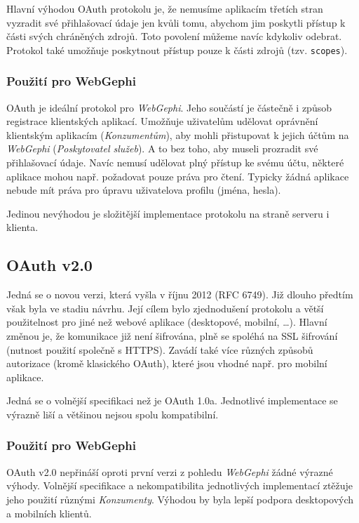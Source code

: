 \documentclass[thesis=M,czech]{FITthesis}[2014/05/6]
\begin{document}
Hlavní výhodou OAuth protokolu je, že nemusíme aplikacím třetích stran vyzradit své přihlašovací údaje jen kvůli tomu, abychom jim poskytli přístup k části svých chráněných zdrojů. Toto povolení můžeme navíc
kdykoliv odebrat. Protokol také umožňuje poskytnout přístup pouze k části zdrojů (tzv. \texttt{scopes}).

\subsubsection{Použití pro WebGephi}
OAuth je ideální protokol pro \textit{WebGephi}. Jeho součástí je částečně i způsob registrace klientských aplikací. Umožňuje uživatelům udělovat oprávnění klientským aplikacím (\textit{Konzumentům}), aby mohli 
přistupovat k jejich účtům na \textit{WebGephi} (\textit{Poskytovatel služeb}). A to bez toho, aby museli prozradit své přihlašovací údaje. Navíc nemusí udělovat plný přístup
ke svému účtu, některé aplikace mohou např. požadovat pouze práva pro čtení. Typicky žádná aplikace nebude mít práva pro úpravu uživatelova profilu (jména, hesla).

Jedinou nevýhodou je složitější implementace protokolu na straně serveru i klienta.

\subsection{OAuth v2.0\cite{oauth:v2}}
Jedná se o novou verzi, která vyšla v říjnu 2012 (RFC 6749). Již dlouho předtím však byla ve stadiu návrhu. Její cílem bylo zjednodušení protokolu
a větší použitelnost pro jiné než webové aplikace (desktopové, mobilní, \ldots). Hlavní změnou je, že komunikace již není šifrována, plně se spoléhá na SSL šifrování
(nutnost použití společně s HTTPS). Zavádí také více různých způsobů autorizace (kromě klasického  OAuth), které jsou vhodné např. pro mobilní aplikace.

Jedná se o volnější specifikaci než je OAuth 1.0a. Jednotlivé implementace se výrazně liší a většinou nejsou spolu kompatibilní.

\subsubsection{Použití pro WebGephi}
OAuth v2.0 nepřináší oproti první verzi z pohledu \textit{WebGephi} žádné výrazné výhody. Volnější specifikace a nekompatibilita jednotlivých implementací ztěžuje 
jeho použití různými \textit{Konzumenty}. Výhodou by byla lepší podpora desktopových a mobilních klientů.
\end{document}
